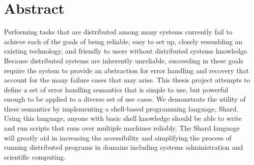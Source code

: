 \documentclass[oneside]{report}
\begin{document}



\tableofcontents
\listoffigures
\listoftables
\onehalfspacing

\chapter*{Abstract}

Performing tasks that are distributed among many systems currently fail to achieve each of the goals of being reliable, easy to set up, closely resembling an existing technology, and friendly to users without distributed systems knowledge.
Because distributed systems are inherently unreliable, succeeding in these goals require the system to provide an abstraction for error handling and recovery that account for the many failure cases that may arise.
This thesis project attempts to define a set of error handling semantics that is simple to use, but powerful enough to be applied to a diverse set of use cases.
We demonstrate the utility of these semantics by implementing a shell-based programming language, Shard.
Using this language, anyone with basic shell knowledge should be able to write and run scripts that runs over multiple machines reliably.
The Shard language will greatly aid in increasing the accessibility and simplifying the process of running distributed programs in domains including systems administration and scientific computing.
\end{document}
